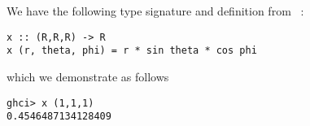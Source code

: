 
We have the following type signature and definition from \
:
\scriptsize\begin{verbatim}
x :: (R,R,R) -> R
x (r, theta, phi) = r * sin theta * cos phi
\end{verbatim}\normalsize
which we demonstrate as follows
\scriptsize\begin{verbatim}
ghci> x (1,1,1)
0.4546487134128409
\end{verbatim}\normalsize
